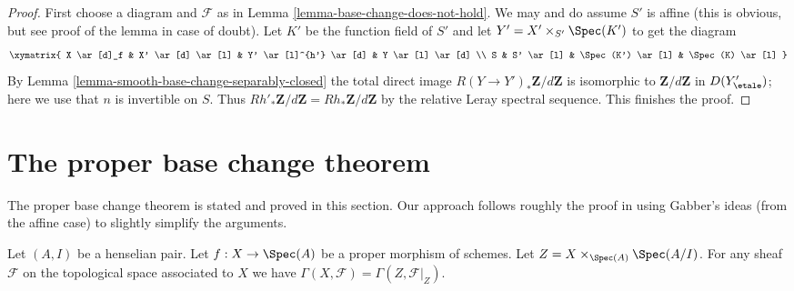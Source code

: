 \begin{proof}
First choose a diagram and $\mathcal{F}$ as in
Lemma \ref{lemma-base-change-does-not-hold}.
We may and do assume $S'$ is affine (this is obvious, but
see proof of the lemma in case of doubt).
Let $K'$ be the function field of $S'$
and let $Y' = X' \times_{S'} \Spec(K')$ to get the diagram
$$
\xymatrix{
X \ar[d]_f &
X' \ar[d] \ar[l] &
Y' \ar[l]^{h'} \ar[d] &
Y \ar[l] \ar[d] \\
S &
S' \ar[l] &
\Spec(K') \ar[l] &
\Spec(K) \ar[l]
}
$$
By Lemma \ref{lemma-smooth-base-change-separably-closed}
the total direct image $R(Y \to Y')_*\mathbf{Z}/d\mathbf{Z}$
is isomorphic to $\mathbf{Z}/d\mathbf{Z}$ in $D(Y'_\etale)$; here
we use that $n$ is invertible on $S$.
Thus $Rh'_*\mathbf{Z}/d\mathbf{Z} = Rh_*\mathbf{Z}/d\mathbf{Z}$
by the relative Leray spectral sequence. This finishes the proof.
\end{proof}










\section{The proper base change theorem}
\label{section-proper-base-change}

\noindent
The proper base change theorem is stated and proved in this section.
Our approach follows roughly the proof in \cite[XII, Theorem 5.1]{SGA4}
using Gabber's ideas (from the affine case) to slightly simplify
the arguments.

\begin{lemma}
\label{lemma-zariski-h0-proper-over-henselian-pair}
Let $(A, I)$ be a henselian pair. Let $f : X \to \Spec(A)$ be a proper morphism
of schemes. Let $Z = X \times_{\Spec(A)} \Spec(A/I)$. For any
sheaf $\mathcal{F}$ on the topological space associated to $X$ we
have $\Gamma(X, \mathcal{F}) = \Gamma(Z, \mathcal{F}|_Z)$.
\end{lemma}

